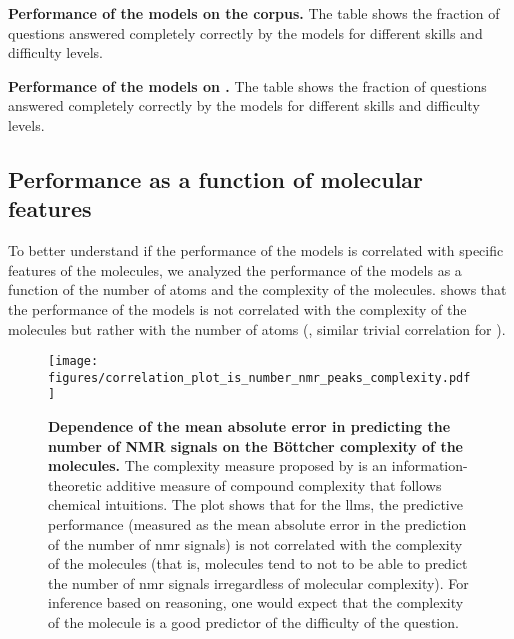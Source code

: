 \begin{table}
    \caption{\textbf{Performance of the models on the \chembench corpus.} The table shows the fraction of questions answered completely correctly by the models for different skills and difficulty levels.}
    \label{tab:performance_table}
\end{table}

\begin{table}
    \caption{\textbf{Performance of the models on \chembenchmini.} The table shows the fraction of questions answered completely correctly by the models for different skills and difficulty levels.}
    \label{tab:performance_table_human_subset}
\end{table}



\clearpage

\subsection{Performance as a function of molecular features} \label{sec:molecular_features}
To better understand if the performance of the models is correlated with specific features of the molecules, we analyzed the performance of the models as a function of the number of atoms and the complexity of the molecules.
 shows that the performance of the models is not correlated with the complexity of the molecules but rather with the number of atoms (, similar trivial correlation for ).

\begin{figure}[!h]
    \centering
    \texttt{[image: figures/correlation\_plot\_is\_number\_nmr\_peaks\_complexity.pdf]}
    \caption{\textbf{Dependence of the mean absolute error in predicting the number of NMR signals on the Böttcher complexity of the molecules.} The complexity measure proposed by \textcite{B_ttcher_2016} is an information-theoretic additive measure of compound complexity that follows chemical intuitions.
    The plot shows that for the \glspl{llm}, the predictive performance (measured as the mean absolute error in the prediction of the number of \gls{nmr} signals) is not correlated with the complexity of the molecules (that is, molecules tend to not to be able to predict the number of \gls{nmr} signals irregardless of molecular complexity). For inference based on reasoning, one would expect that the complexity of the molecule is a good predictor of the difficulty of the question.}
    \label{fig:correlation_plot_is_number_nmr_peaks_complexity}
\end{figure}

